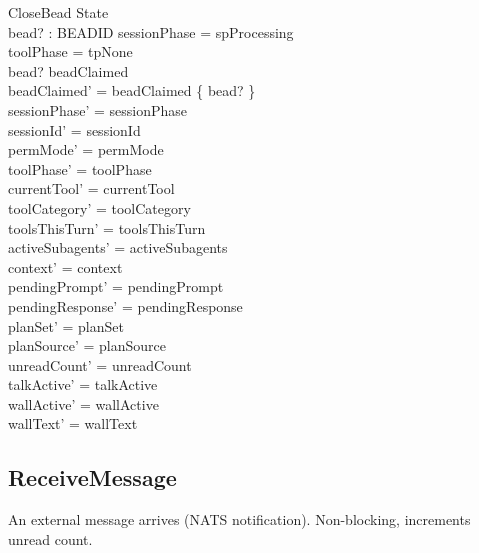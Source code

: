 \documentclass[a4paper,10pt,fleqn]{article}
\begin{document}
\begin{schema}{CloseBead}
  \Delta State \\
  bead? : BEADID
  \where
  sessionPhase = spProcessing \\
  toolPhase = tpNone \\
  bead? \in beadClaimed \\
  beadClaimed' = beadClaimed \setminus \{ bead? \} \\
  sessionPhase' = sessionPhase \\
  sessionId' = sessionId \\
  permMode' = permMode \\
  toolPhase' = toolPhase \\
  currentTool' = currentTool \\
  toolCategory' = toolCategory \\
  toolsThisTurn' = toolsThisTurn \\
  activeSubagents' = activeSubagents \\
  context' = context \\
  pendingPrompt' = pendingPrompt \\
  pendingResponse' = pendingResponse \\
  planSet' = planSet \\
  planSource' = planSource \\
  unreadCount' = unreadCount \\
  talkActive' = talkActive \\
  wallActive' = wallActive \\
  wallText' = wallText
\end{schema}

\subsection{ReceiveMessage}

An external message arrives (NATS notification). Non-blocking,
increments unread count.
\end{document}
